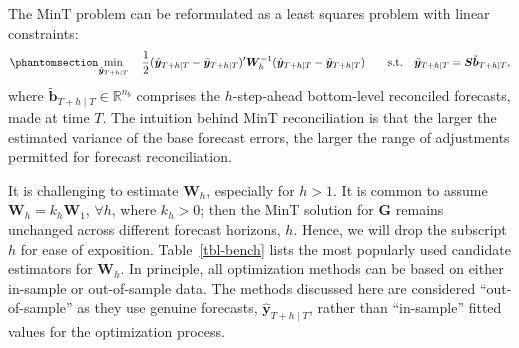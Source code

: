 \documentclass[
  11pt]{article}
\theoremstyle{plain}
\theoremstyle{remark}
\begin{document}
The MinT problem can be reformulated as a least squares problem with
linear constraints: \begin{equation}\phantomsection\label{eq-mint_op}{
\min_{\tilde{\bm{y}}_{T+h \mid T}} \quad \frac{1}{2}(\hat{\bm{y}}_{T+h \mid T}-\tilde{\bm{y}}_{T+h \mid T})^{\prime} \bm{W}_{h}^{-1}(\hat{\bm{y}}_{T+h \mid T}-\tilde{\bm{y}}_{T+h \mid T})
 \qquad \text{s.t.} \quad \tilde{\bm{y}}_{T+h \mid T}=\bm{S}\tilde{\bm{b}}_{T+h \mid T},
}\end{equation} where
\(\tilde{\bm{b}}_{T+h \mid T} \in \mathbb{R}^{n_b}\) comprises the
\(h\)-step-ahead bottom-level reconciled forecasts, made at time \(T\).
The intuition behind MinT reconciliation is that the larger the
estimated variance of the base forecast errors, the larger the range of
adjustments permitted for forecast reconciliation.

It is challenging to estimate \(\bm{W}_h\), especially for \(h > 1\). It
is common to assume \(\bm{W}_h = k_h\bm{W}_1\), \(\forall h\), where
\(k_h > 0\); then the MinT solution for \(\bm{G}\) remains unchanged
across different forecast horizons, \(h\). Hence, we will drop the
subscript \(h\) for ease of exposition. Table~\ref{tbl-bench} lists the
most popularly used candidate estimators for \(\bm{W}_h\). In principle,
all optimization methods can be based on either in-sample or
out-of-sample data. The methods discussed here are considered
``out-of-sample'' as they use genuine forecasts,
\(\hat{\bm{y}}_{T+h \mid T}\), rather than ``in-sample'' fitted values
for the optimization process.
\end{document}
